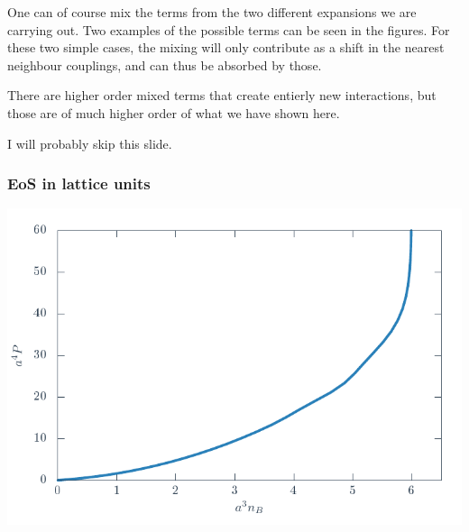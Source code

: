 \documentclass[12pt,a4paper,dvipsnames,usenames]{beamer}
\begin{document}
\begin{frame}
  \note
  {
    One can of course mix the terms from the two different expansions we are carrying out. Two examples of the possible terms can
    be seen in the figures. For these two simple cases, the mixing will only contribute as a shift in the nearest neighbour
    couplings, and can thus be absorbed by those.

    \vspace{1em}

    There are higher order mixed terms that create entierly new interactions, but those are of much higher order of what we have
    shown here.

    \vspace{1em}

    I will probably skip this slide.
  }

\end{frame}

\begin{frame}
  \frametitle{EoS in lattice units}
  {\centering%
    \includegraphics[width=\textwidth]{Plots/eos.pdf}
  \par}
\end{frame}
\end{document}
